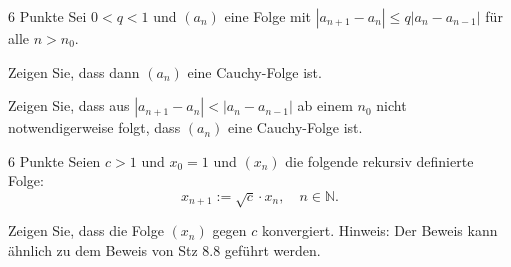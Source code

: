 \documentclass{../problemset}
\begin{document}
\begin{problem}{6 Punkte}
Sei $0 < q < 1$ und $(a_n)$ eine Folge mit $|a_{n+1} - a_n| \leq q |a_n - a_{n-1}|$ für alle $n > n_0$.

\item Zeigen Sie, dass dann $(a_n)$ eine Cauchy-Folge ist.

\item Zeigen Sie, dass aus $|a_{n+1} - a_n| < |a_n - a_{n-1}|$ ab einem $n_0$ nicht notwendigerweise folgt, dass $(a_n)$ eine Cauchy-Folge ist.
\end{problem}

\begin{problem}{6 Punkte}
Seien $c > 1$ und $x_0 = 1$ und $(x_n)$ die folgende rekursiv definierte Folge:
\[
	x_{n+1} := \sqrt{c} \cdot x_n, \quad n \in \mathbb{N}.
\]

Zeigen Sie, dass die Folge $(x_n)$ gegen $c$ konvergiert. Hinweis: Der Beweis kann ähnlich zu dem Beweis von Stz 8.8 geführt werden.
\end{problem}
\end{document}
